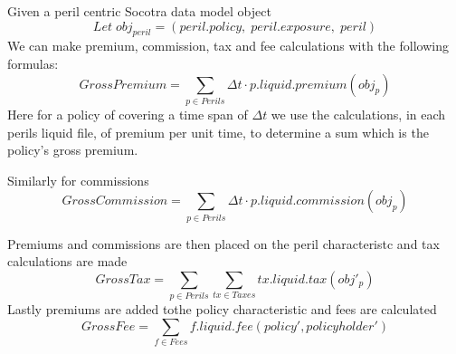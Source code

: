Given a peril centric Socotra data model object
\begin{equation*}
Let \; obj_{peril} = (peril.policy, \; peril.exposure, \; peril)
\end{equation*}
We can make premium, commission, tax and fee calculations with the following formulas:
\begin{equation*}
GrossPremium = \sum_{p \in Perils} \Delta t \cdot p.liquid.premium(obj_p) 
\end{equation*}
Here for a policy of covering a time span of $\Delta t$ we use the calculations, in each perils liquid file,
of premium per unit time, to determine a sum which is the policy's gross premium.

Similarly for commissions
\begin{equation*}
GrossCommission = \sum_{p \in Perils} \Delta t \cdot p.liquid.commission(obj_p)
\end{equation*}

Premiums and commissions are then placed on the peril characteristc and tax calculations are made
\begin{equation*}
  GrossTax = \sum_{p \in Perils} \sum_{tx \in Taxes} tx.liquid.tax(obj'_p) 
\end{equation*}
Lastly premiums are added tothe policy characteristic and fees are calculated
\begin{equation*}
GrossFee = \sum_{f \in Fees} f.liquid.fee(policy', policyholder')
\end{equation*}

